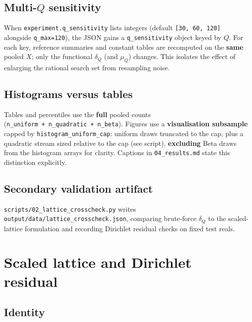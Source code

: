 \documentclass[
]{article}
\begin{document}
\subsection{\texorpdfstring{Multi-\(Q\)
sensitivity}{Multi-Q sensitivity}}\label{multi-q-sensitivity}

When \texttt{experiment.q\_sensitivity} lists integers (default
\texttt{{[}30,\ 60,\ 120{]}} alongside \texttt{q\_max=120}), the JSON
gains a \texttt{q\_sensitivity} object keyed by \(Q\). For each key,
reference summaries and constant tables are recomputed on the
\textbf{same} pooled \(X\); only the functional \(\delta_Q\) (and
\(\mu_Q\)) changes. This isolates the effect of enlarging the rational
search set from resampling noise.

\subsection{Histograms versus tables}\label{histograms-versus-tables}

Tables and percentiles use the \textbf{full} pooled counts
(\texttt{n\_uniform\ +\ n\_quadratic\ +\ n\_beta}). Figures use a
\textbf{visualisation subsample} capped by
\texttt{histogram\_uniform\_cap}: uniform draws truncated to the cap,
plus a quadratic stream sized relative to the cap (see script),
\textbf{excluding} Beta draws from the histogram arrays for clarity.
Captions in \texttt{04\_results.md} state this distinction explicitly.

\subsection{Secondary validation
artifact}\label{secondary-validation-artifact}

\texttt{scripts/02\_lattice\_crosscheck.py} writes
\texttt{output/data/lattice\_crosscheck.json}, comparing brute-force
\(\delta_Q\) to the scaled-lattice formulation and recording Dirichlet
residual checks on fixed test reals.

\newpage

\section{Scaled lattice and Dirichlet
residual}\label{scaled-lattice-and-dirichlet-residual}

\subsection{Identity}\label{identity}
\end{document}

